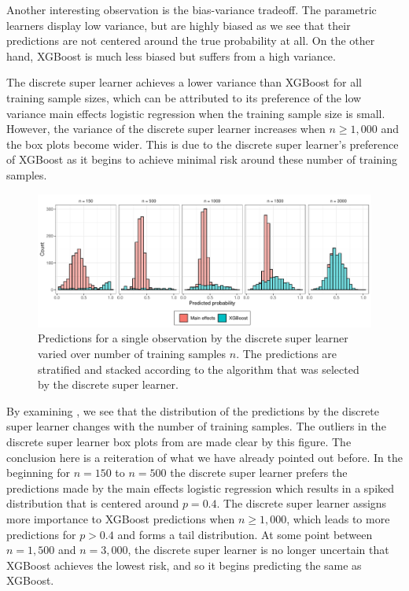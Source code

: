 \documentclass[./main.tex]{subfiles}
\begin{document}
Another interesting observation is the bias-variance tradeoff. The parametric learners display low variance, but are highly biased as we see that their predictions are not centered around the true probability at all. On the other hand, XGBoost is much less biased but suffers from a high variance.

The discrete super learner achieves a lower variance than XGBoost for all training sample sizes, which can be attributed to its preference of the low variance main effects logistic regression when the training sample size is small. However, the variance of the discrete super learner increases when $ n \geq 1,000 $ and the box plots become wider. This is due to the discrete super learner's preference of XGBoost as it begins to achieve minimal risk around these number of training samples. 

\begin{figure}[H]
    \centering
    \includegraphics[width=\textwidth]{figures/preds_dsl_shift.pdf}
    \caption{Predictions for a single observation by the discrete super learner varied over number of training samples $ n $. The predictions are stratified and stacked according to the algorithm that was selected by the discrete super learner.} 
    \label{fig:dsl_shift}
\end{figure}
By examining , we see that the distribution of the predictions by the discrete super learner changes with the number of training samples. The outliers in the discrete super learner box plots from  are made clear by this figure. The conclusion here is a reiteration of what we have already pointed out before. In the beginning for $ n = 150 $ to $ n = 500 $ the discrete super learner prefers the predictions made by the main effects logistic regression which results in a spiked distribution that is centered around $ p = 0.4 $. The discrete super learner assigns more importance to XGBoost predictions when $n \geq 1,000$, which leads to more predictions for $p > 0.4$ and forms a tail distribution. At some point between $ n = 1,500 $ and $ n = 3,000 $, the discrete super learner is no longer uncertain that XGBoost achieves the lowest risk, and so it begins predicting the same as XGBoost. 
\end{document}
